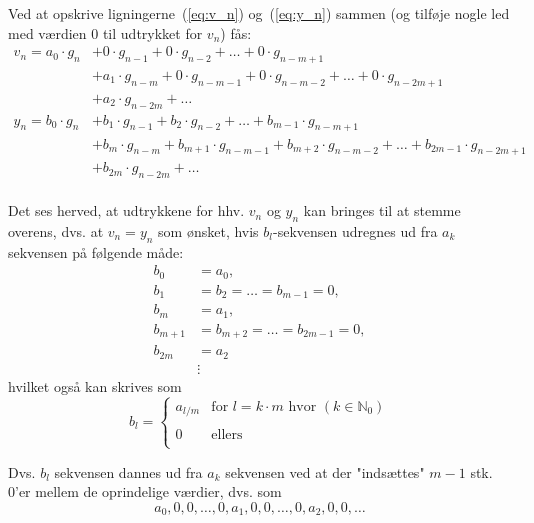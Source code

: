 \documentclass[dvips,11pt,a4paper]{article}
\begin{document}
\noindent{}Ved at opskrive ligningerne~(\ref{eq:v_n}) og~(\ref{eq:y_n}) sammen (og tilføje nogle led med værdien 0 til udtrykket for $v_n$) fås:
\begin{align*}
v_{n} = a_{0}\cdot{}g_{n} &+ 0\cdot{}g_{n-1} + 0\cdot{}g_{n-2} + \ldots + 0\cdot{}g_{n-m+1}\\
&+ a_{1}\cdot{}g_{n-m} + 0\cdot{}g_{n-m-1} + 0\cdot{}g_{n-m-2} + \ldots + 0\cdot{}g_{n-2m+1}\\
&+ a_{2}\cdot{}g_{n-2m} + \ldots{} \\
y_{n} = b_{0}\cdot{}g_{n} &+ b_{1}\cdot{}g_{n-1} + b_{2}\cdot{}g_{n-2} + \ldots + b_{m-1}\cdot{}g_{n-m+1} \\
&+ b_{m}\cdot{}g_{n-m} + b_{m+1}\cdot{}g_{n-m-1} + b_{m+2}\cdot{}g_{n-m-2} + \ldots + b_{2m-1}\cdot{}g_{n-2m+1}\\
&+ b_{2m}\cdot{}g_{n-2m} + \ldots \\
\end{align*}

\noindent{}Det ses herved, at udtrykkene for hhv. $v_n$ og $y_n$ kan bringes til at stemme overens, dvs. at $v_n = y_n$ som ønsket, hvis $b_l$-sekvensen udregnes ud fra $a_k$ sekvensen på følgende måde:
\begin{align*}
b_{0}&=a_{0},\\
b_{1}&=b_{2}=\ldots{}=b_{m-1}=0,\\
b_{m}&=a_{1},\\
b_{m+1}&=b_{m+2}=\ldots{}=b_{2m-1}=0,\\
b_{2m}&=a_{2}\\
&\vdots
\end{align*}
hvilket også kan skrives som
\[
b_{l}=\left\lbrace
\begin{array}{ll}
a_{l/m} & \textrm{for }l=k\cdot{}m\textrm{ hvor }(k\in{}\mathbb{N}_{0}) \\
 & \\
0 & \textrm{ellers}\\
\end{array}
\right.
\]

\noindent{}Dvs. $b_{l}$ sekvensen dannes ud fra $a_{k}$ sekvensen ved at der "indsættes" $m-1$ stk. 0'er mellem de oprindelige værdier, dvs. som
\[
a_0,0,0,\ldots,0,a_1,0,0,\ldots,0,a_2,0,0,\ldots
\]
\end{document}
